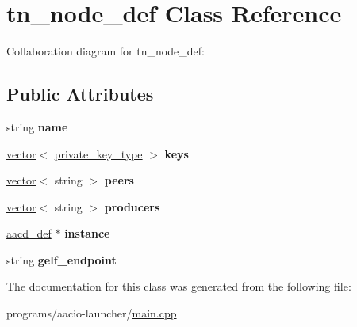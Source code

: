 \hypertarget{classtn__node__def}{}\section{tn\+\_\+node\+\_\+def Class Reference}
\label{classtn__node__def}


Collaboration diagram for tn\+\_\+node\+\_\+def\+:
\subsection*{Public Attributes}
\begin{DoxyCompactItemize}
\item 
\mbox{\label{classtn__node__def_a0aa81fe136c8ff5db0040e94d959885e}} 
string {\bfseries name}
\item 
\mbox{\label{classtn__node__def_a0bd6a18315ea7b0c949d64a090dc1746}} 
\mbox{\hyperlink{classstd_1_1vector}{vector}}$<$ \mbox{\hyperlink{classfc_1_1crypto_1_1private__key}{private\+\_\+key\+\_\+type}} $>$ {\bfseries keys}
\item 
\mbox{\label{classtn__node__def_ad02268d098aa5072ed3f6ce6edcda5b1}} 
\mbox{\hyperlink{classstd_1_1vector}{vector}}$<$ string $>$ {\bfseries peers}
\item 
\mbox{\label{classtn__node__def_aeb61f31e08df2ddcc5725187e59bb5bd}} 
\mbox{\hyperlink{classstd_1_1vector}{vector}}$<$ string $>$ {\bfseries producers}
\item 
\mbox{\label{classtn__node__def_a3b9dc0fbc3d5f25b8e9c4ceca10bf3d8}} 
\mbox{\hyperlink{classaacd__def}{aacd\+\_\+def}} $\ast$ {\bfseries instance}
\item 
\mbox{\label{classtn__node__def_a160462d5c40eaabbef44112d8727f3c0}} 
string {\bfseries gelf\+\_\+endpoint}
\end{DoxyCompactItemize}


The documentation for this class was generated from the following file\+:\begin{DoxyCompactItemize}
\item 
programs/aacio-\/launcher/\mbox{\hyperlink{programs_2aacio-launcher_2main_8cpp}{main.\+cpp}}\end{DoxyCompactItemize}

